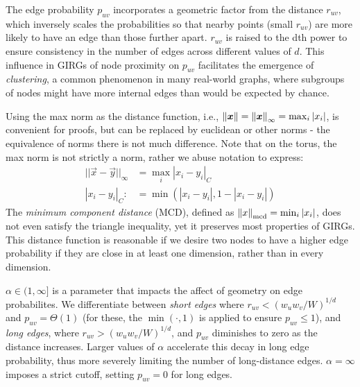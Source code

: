The edge probability $p_{uv}$ incorporates a geometric factor from the distance $r_{uv}$, which inversely scales the probabilities so that nearby points (small $r_{uv}$) are more likely to have an edge than those further apart.
$r_{uv}$ is raised to the dth power to ensure consistency in the number of edges across different values of $d$.
This influence in GIRGs of node proximity on $p_{uv}$ facilitates the emergence of \textit{clustering}, a common phenomenon in many real-world graphs, where subgroups of nodes might have more internal edges than would be expected by chance.




Using the max norm as the distance function, i.e., $\left\lVert \bm{x}\right\rVert = \left\lVert \bm{x}\right\rVert_\infty = \max_i |x_i|$, is convenient for proofs, but can be replaced by euclidean or other norms - the equivalence of norms there is not much difference. Note that on the torus, the max norm is not strictly a norm, rather we abuse notation to express:
\begin{align}
    ||\vec{x} - \vec{y}||_\infty &= \max_i |x_i - y_i|_C\\
    |x_i - y_i|_C :&= \min(|x_i - y_i|, 1 - |x_i - y_i|)
\end{align}
The \textit{minimum component distance} (MCD), defined as $\left\lVert x\right\rVert_{\mathrm{mcd}} = \min_i |x_i|$, does not even satisfy the triangle inequality, yet it preserves most properties of GIRGs. This distance function is reasonable if we desire two nodes to have a higher edge probability if they are close in at least one dimension, rather than in every dimension.

$\alpha \in (1, \infty]$ is a parameter that impacts the affect of geometry on edge probabilites. We differentiate between \textit{short edges} where $r_{uv} < (w_u w_v / W)^{1/d}$ and $p_{uv} = \Theta(1)$ (for these, the $\min(\cdot, 1)$ is applied to ensure $p_{uv} \leq 1$), and \textit{long edges}, where $r_{uv} > (w_u w_v / W)^{1/d}$, and $p_{uv}$ diminishes to zero as the distance increases. Larger values of $\alpha$ accelerate this decay in long edge probability, thus more severely limiting the number of long-distance edges. $\alpha=\infty$ imposes a strict cutoff, setting $p_{uv} = 0$ for long edges.


